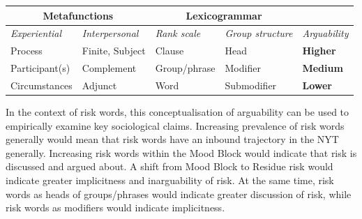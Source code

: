 		\begin{table}
		\centering
		\footnotesize
   		\begin{tabular}{|l|l|l|l||l|}
		\cline{1-4}
		\multicolumn{2}{|c|}{\textbf{Metafunctions}} & \multicolumn{2}{c||}{\textbf{Lexicogrammar}} & \multicolumn{1}{c}{~} \\ \hline
   		 \emph{Experiential}  & \emph{Interpersonal}   & \emph{Rank scale}         & \emph{Group structure} & \emph{Arguability} \\ \hline
   		 Process       & Finite, Subject & Clause       & Head            & \textbf{Higher}                   \\ \hline
    		Participant(s)  & Complement      & Group/phrase & Modifier        & \textbf{Medium}                 \\ \hline
    		Circumstances & Adjunct         & Word         & Submodifier     & \textbf{Lower}                    \\ \hline
   		\end{tabular}
		\end{table}


	  In the context of risk words, this conceptualisation of arguability can be used to empirically examine key sociological claims. Increasing prevalence of risk words generally would mean that risk words have an inbound trajectory in the NYT generally. Increasing risk words within the Mood Block would indicate that risk is discussed and argued about. A shift from Mood Block to Residue risk would indicate greater implicitness and inarguability of risk. At the same time, risk words as heads of groups/phrases would indicate greater discussion of risk, while risk words as modifiers would indicate implicitness.
		
